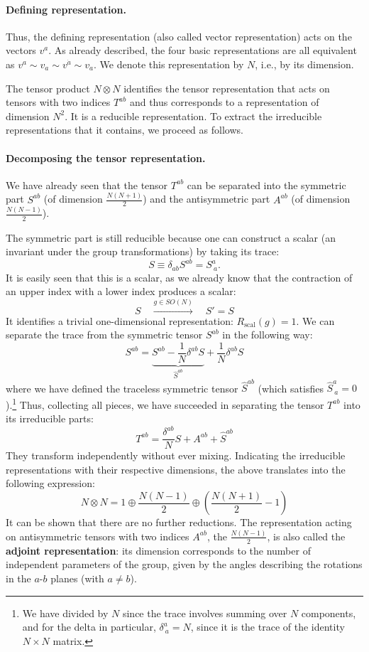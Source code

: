 \paragraph{Defining representation.}
Thus, the defining representation (also called vector representation) acts on the vectors \(v^a\). As already described, the four basic representations are all equivalent as \(v^a \sim v_a \sim v^{\dot{a}} \sim v_{\dot{a}}\). We denote this representation by \(N\), i.e., by its dimension.

The tensor product \(N \otimes N\) identifies the tensor representation that acts on tensors with two indices \(T^{ab}\) and thus corresponds to a representation of dimension \(N^2\). It is a reducible representation. To extract the irreducible representations that it contains, we proceed as follows.

\paragraph{Decomposing the tensor representation.}
We have already seen that the tensor \(T^{ab}\) can be separated into the symmetric part \(S^{ab}\) (of dimension \(\frac{N(N+1)}{2}\)) and the antisymmetric part \(A^{ab}\) (of dimension \(\frac{N(N-1)}{2}\)).

The symmetric part is still reducible because one can construct a scalar (an invariant under the group transformations) by taking its trace:
\[
    S \equiv \delta_{ab} S^{ab} = S^a_{\ a}.
\]
It is easily seen that this is a scalar, as we already know that the contraction of an upper index with a lower index produces a scalar:
\[
    S \quad \xrightarrow{g \in SO(N)} \quad S' = S
\]
It identifies a trivial one-dimensional representation: \(R_{\text{scal}}(g) = 1\). We can separate the trace from the symmetric tensor \(S^{ab}\) in the following way:
\[
    S^{ab} = \underbrace{S^{ab} - \frac{1}{N} \delta^{ab} S}_{\hat{S}^{ab}} + \frac{1}{N} \delta^{ab} S
\]
where we have defined the traceless symmetric tensor \(\hat{S}^{ab}\) (which satisfies \(\hat{S}^a_{\ a} = 0\)).\footnote{We have divided by \(N\) since the trace involves summing over \(N\) components, and for the delta in particular, \(\delta^a_{\ a} = N\), since it is the trace of the identity \(N\times N\) matrix.} Thus, collecting all pieces, we have succeeded in separating the tensor \(T^{ab}\) into its irreducible parts:
\[
    T^{ab} = \frac{\delta^{ab}}{N} S + A^{ab} + \hat{S}^{ab}
\]
They transform independently without ever mixing. Indicating the irreducible representations with their respective dimensions, the above translates into the following expression:
\[
    N \otimes N = 1 \oplus \frac{N(N-1)}{2} \oplus \left( \frac{N(N+1)}{2} - 1 \right)
\]
It can be shown that there are no further reductions. The representation acting on antisymmetric tensors with two indices \(A^{ab}\), the \(\frac{N(N-1)}{2}\), is also called the \textbf{adjoint representation}: its dimension corresponds to the number of independent parameters of the group, given by the angles describing the rotations in the \(a\)-\(b\) planes (with \(a \neq b\)).

